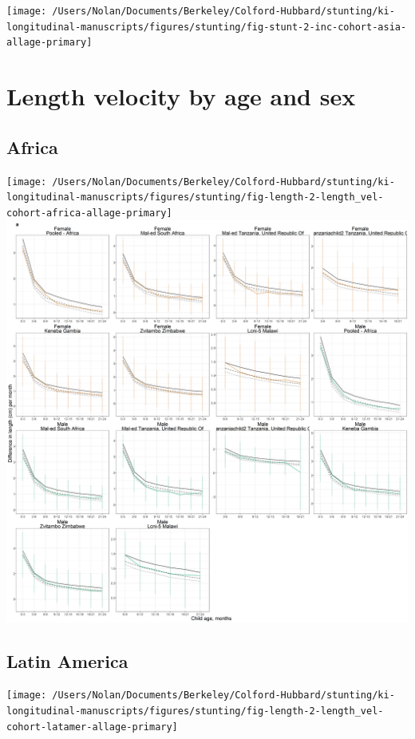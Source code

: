 \documentclass[9pt,]{book}
\begin{document}
\texttt{[image: /Users/Nolan/Documents/Berkeley/Colford-Hubbard/stunting/ki-longitudinal-manuscripts/figures/stunting/fig-stunt-2-inc-cohort-asia-allage-primary]}

\section{Length velocity by age and
sex}\label{length-velocity-by-age-and-sex}

\subsection{Africa}\label{africa-3}

\texttt{[image: /Users/Nolan/Documents/Berkeley/Colford-Hubbard/stunting/ki-longitudinal-manuscripts/figures/stunting/fig-length-2-length\_vel-cohort-africa-allage-primary]}
\includegraphics[width=75in]{figure-copies/fig-length-2-length_vel-cohort-africa-allage-primary}

\subsection{Latin America}\label{latin-america-3}

\texttt{[image: /Users/Nolan/Documents/Berkeley/Colford-Hubbard/stunting/ki-longitudinal-manuscripts/figures/stunting/fig-length-2-length\_vel-cohort-latamer-allage-primary]}
\end{document}
